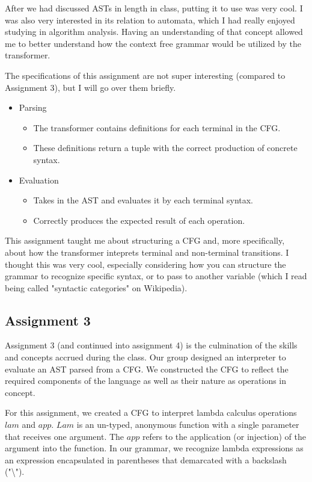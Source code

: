 \documentclass{article}
\theoremstyle{theorem}
\theoremstyle{definition}
\theoremstyle{remark}
\begin{document}
After we had discussed ASTs in length in class, putting it to use was very cool. I was also very interested in its relation to automata, which I had really enjoyed studying in algorithm analysis. Having an understanding of that concept allowed me to better understand how the context free grammar would be utilized by the transformer.

The specifications of this assignment are not super interesting (compared to Assignment 3), but I will go over them briefly.

\begin{itemize}
  \item Parsing
    \begin{itemize}
      \item The transformer contains definitions for each terminal in the CFG.
      \item These definitions return a tuple with the correct production of concrete syntax.
    \end{itemize}
  \item Evaluation
    \begin{itemize}
      \item Takes in the AST and evaluates it by each terminal syntax.
      \item Correctly produces the expected result of each operation.
    \end{itemize}
\end{itemize}

This assignment taught me about structuring a CFG and, more specifically, about how the transformer inteprets terminal and non-terminal transitions. I thought this was very cool, especially considering how you can structure the grammar to recognize specific syntax, or to pass to another variable (which I read being called "syntactic categories" on Wikipedia).

\subsection{Assignment 3}

Assignment 3 (and continued into assignment 4) is the culmination of the skills and concepts accrued during the class. Our group designed an interpreter to evaluate an AST parsed from a CFG. We constructed the CFG to reflect the required components of the language as well as their nature as operations in concept.

For this assignment, we created a CFG to interpret lambda calculus operations $lam$ and $app$. $Lam$ is an un-typed, anonymous function with a single parameter that receives one argument. The $app$ refers to the application (or injection) of the argument into the function. In our grammar, we recognize lambda expressions as an expression encapsulated in parentheses that demarcated with a backslash ("\textbackslash"). 
\end{document}
